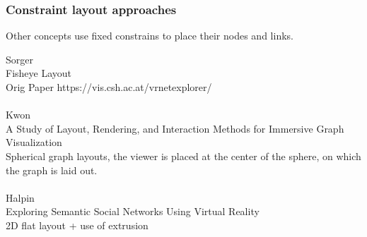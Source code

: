 \subsubsection{Constraint layout approaches}
Other concepts use fixed constrains to place their nodes and links.

Sorger\\
Fisheye Layout\\
Orig Paper https://vis.csh.ac.at/vrnetexplorer/\\
\\
Kwon\\
A Study of Layout, Rendering, and Interaction Methods for Immersive Graph Visualization\\
Spherical graph layouts, the viewer is placed at the center of the sphere, on which the graph is laid out.\\
\\
Halpin\\
Exploring Semantic Social Networks Using Virtual Reality\\
2D flat layout + use of extrusion
\\
\\
\\
